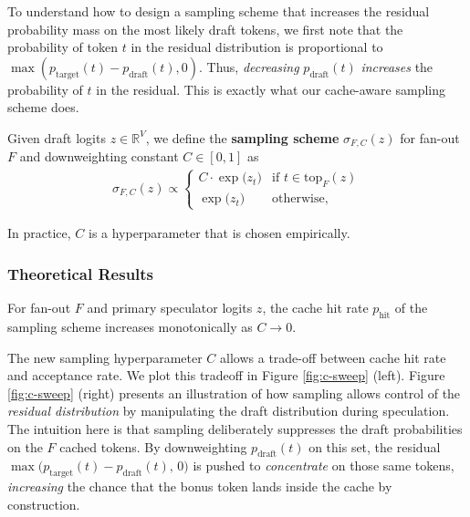 To understand how to design a sampling scheme that increases the residual probability mass on the most likely draft tokens, we first note that the probability of token $t$ in the residual distribution is proportional to $\max(p_{\mathrm{target}}(t) - p_{\mathrm{draft}}(t), 0)$.
Thus, \textit{decreasing} $p_{\mathrm{draft}}(t)$  \textit{increases} the probability of $t$ in the residual.
This is exactly what our cache-aware sampling scheme does.

\begin{definition}
Given draft logits $z\in \mathbb{R}^V$, we define the \textbf{\Sys sampling scheme} $\sigma_{F,C}(z)$ for fan-out $F$ and downweighting constant $C \in [0, 1]$ as
\begin{eqnarray*}
\sigma_{F,C}(z) \propto  \begin{cases} 
C\cdot \exp\Big(z_t\Big)& \text{if } t \in \text{top}_F(z) \\ \exp\Big(z_t\Big)& \text{otherwise,}
\end{cases}
\end{eqnarray*}
\end{definition}

In practice, $C$ is a hyperparameter that is chosen empirically. 



\subsubsection{Theoretical Results}
\label{sec:cache_sampling_theory}

\begin{theorem}
\label{thm:cache_sample}
For fan-out $F$ and primary speculator logits $z$, the cache hit rate $p_{\mathrm{hit}}$ of the \Sys sampling scheme increases monotonically as $C \rightarrow 0$.
\end{theorem}

The new sampling hyperparameter $C$ allows a trade-off between cache hit rate and acceptance rate. We plot this tradeoff in Figure \ref{fig:c-sweep} (left).
Figure \ref{fig:c-sweep} (right) presents an illustration of how \Sys sampling allows control of the \textit{residual distribution} by manipulating the draft distribution during speculation. 
The intuition here is that \Sys sampling deliberately suppresses the draft probabilities on the $F$ cached tokens.  
By downweighting $p_{\mathrm{draft}}(t)$ on this set, the residual $\max\!\big(p_{\mathrm{target}}(t) - p_{\mathrm{draft}}(t),\,0\big)$
is pushed to \textit{concentrate} on those same tokens, \textit{increasing} the chance that the bonus token lands inside the cache by construction. 


